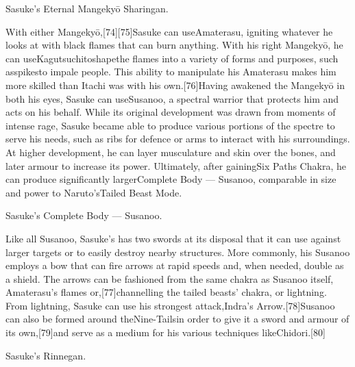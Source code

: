 \documentclass[a4paper,12pt]{article}
\begin{document}
Sasuke's Eternal Mangekyō Sharingan.\\ \par \vspace{0.5cm}

With either Mangekyō,[74][75]Sasuke can useAmaterasu, igniting whatever he looks at with black flames that can burn anything. With his right Mangekyō, he can useKagutsuchitoshapethe flames into a variety of forms and purposes, such asspikesto impale people. This ability to manipulate his Amaterasu makes him more skilled than Itachi was with his own.[76]Having awakened the Mangekyō in both his eyes, Sasuke can useSusanoo, a spectral warrior that protects him and acts on his behalf. While its original development was drawn from moments of intense rage, Sasuke became able to produce various portions of the spectre to serve his needs, such as ribs for defence or arms to interact with his surroundings. At higher development, he can layer musculature and skin over the bones, and later armour to increase its power. Ultimately, after gainingSix Paths Chakra, he can produce significantly largerComplete Body — Susanoo, comparable in size and power to Naruto'sTailed Beast Mode.\\ \par \vspace{0.5cm}

Sasuke's Complete Body — Susanoo.\\ \par \vspace{0.5cm}

Like all Susanoo, Sasuke's has two swords at its disposal that it can use against larger targets or to easily destroy nearby structures. More commonly, his Susanoo employs a bow that can fire arrows at rapid speeds and, when needed, double as a shield. The arrows can be fashioned from the same chakra as Susanoo itself, Amaterasu's flames or,[77]channelling the tailed beasts' chakra, or lightning. From lightning, Sasuke can use his strongest attack,Indra's Arrow.[78]Susanoo can also be formed around theNine-Tailsin order to give it a sword and armour of its own,[79]and serve as a medium for his various techniques likeChidori.[80]\\ \par \vspace{0.5cm}

Sasuke's Rinnegan.\\ \par \vspace{0.5cm}
\end{document}
